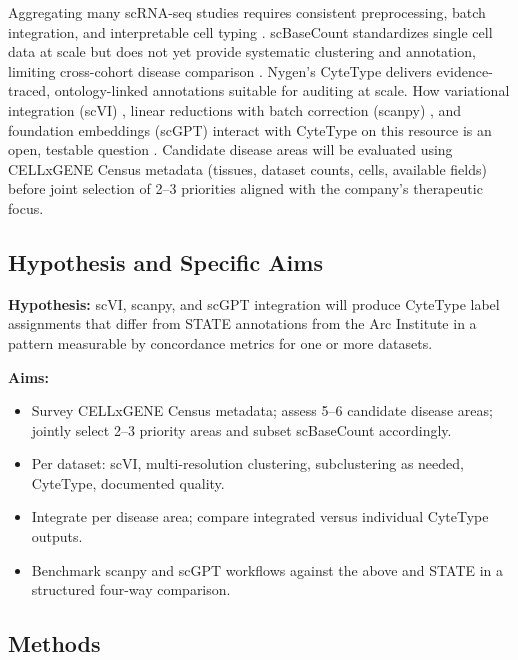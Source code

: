 \documentclass[12pt,a4paper]{article}
\begin{document}
Aggregating many scRNA-seq studies requires consistent preprocessing, batch integration, and interpretable cell typing \cite{wolfSCANPYLargescaleSinglecell2018}. scBaseCount standardizes single cell data at scale but does not yet provide systematic clustering and annotation, limiting cross-cohort disease comparison \cite{youngblutScBaseCountAIAgentcurated2025}. Nygen's CyteType delivers evidence-traced, ontology-linked annotations suitable for auditing at scale. How variational integration (scVI) \cite{lopezDeepGenerativeModeling2018}, linear reductions with batch correction (scanpy) \cite{wolfSCANPYLargescaleSinglecell2018}, and foundation embeddings (scGPT) \cite{cuiScGPTBuildingFoundation2024} interact with CyteType on this resource is an open, testable question \cite{ahujaMultiagentAIEnables2025}. Candidate disease areas will be evaluated using CELLxGENE Census metadata (tissues, dataset counts, cells, available fields) before joint selection of 2–3 priorities aligned with the company's therapeutic focus.

\subsection*{Hypothesis and Specific Aims}

\textbf{Hypothesis:} scVI, scanpy, and scGPT integration will produce CyteType label assignments that differ from STATE annotations from the Arc Institute in a pattern measurable by concordance metrics for one or more datasets.

\textbf{Aims:}
\begin{itemize}
    \item[\textbf{(A)}] Survey CELLxGENE Census metadata; assess 5–6 candidate disease areas; jointly select 2–3 priority areas and subset scBaseCount accordingly.
    \item[\textbf{(B)}] Per dataset: scVI, multi-resolution clustering, subclustering as needed, CyteType, documented quality.
    \item[\textbf{(C)}] Integrate per disease area; compare integrated versus individual CyteType outputs.
    \item[\textbf{(D)}] Benchmark scanpy and scGPT workflows against the above and STATE in a structured four-way comparison.
\end{itemize}

\subsection*{Methods}
\end{document}
